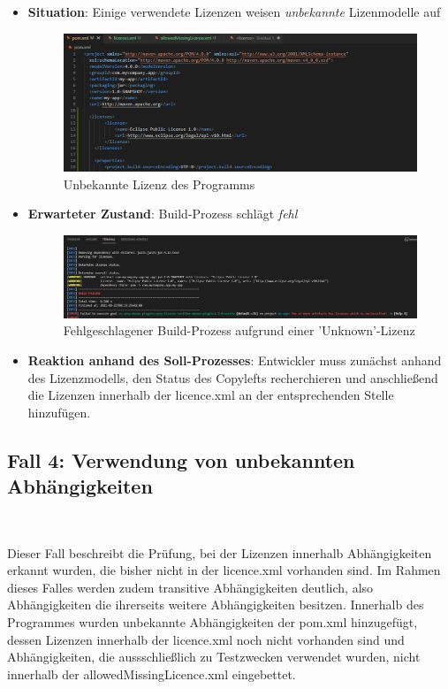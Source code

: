 \begin{itemize}
    \item \textbf{Situation}: Einige verwendete Lizenzen weisen \textit{unbekannte} Lizenmodelle auf
    
    \begin{figure}[h]
        \centering
        \includegraphics[scale=0.5]{Bilder/Fall3Situation.png}
        \caption{Unbekannte Lizenz des Programms}
    \end{figure}

    \item \textbf{Erwarteter Zustand}: Build-Prozess schlägt \textit{fehl} 
    
    \begin{figure}[h]
        \centering
        \includegraphics[scale=0.4]{Bilder/Fall3Zustand.png}
        \caption{Fehlgeschlagener Build-Prozess aufgrund einer 'Unknown'-Lizenz}
    \end{figure}

    \item \textbf{Reaktion anhand des Soll-Prozesses}: Entwickler muss zunächst anhand des Lizenzmodells, den Status des Copylefts recherchieren und anschließend die Lizenzen innerhalb der licence.xml an der entsprechenden Stelle hinzufügen. 
\end{itemize}

\subsection{Fall 4: Verwendung von unbekannten Abhängigkeiten} $~$

Dieser Fall beschreibt die Prüfung, bei der Lizenzen innerhalb Abhängigkeiten erkannt wurden, die bisher nicht in der licence.xml vorhanden sind. Im Rahmen dieses Falles werden zudem transitive Abhängigkeiten deutlich, also Abhängigkeiten die ihrerseits weitere Abhängigkeiten besitzen. Innerhalb des Programmes wurden unbekannte Abhängigkeiten der pom.xml hinzugefügt, dessen Lizenzen innerhalb der licence.xml noch nicht vorhanden sind und Abhängigkeiten, die aussschließlich zu Testzwecken verwendet wurden, nicht innerhalb der allowedMissingLicence.xml eingebettet. 


